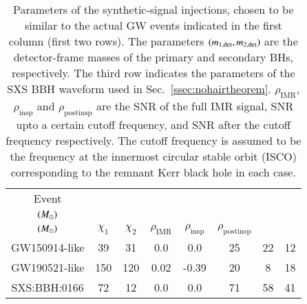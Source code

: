 \begin{table}[h!]
\begin{center}
\begin{tabular}{ c|c|c|c|c|c|c|c }

 Event & \makecell{$m_{\rm 1,det}$ \\ $(M_{\odot})$} &  \makecell{$m_{\rm 2,det}$ \\ $(M_{\odot})$} & $\chi_{1}$ & $\chi_{2}$ & $\rho_\text{IMR}$ & $\rho_\text{insp}$ & $\rho_\text{postinsp}$ \\
 \hline
 GW150914-like & 39 & 31 & 0.0 & 0.0 & 25 & 22 & 12 \\
 GW190521-like & 150 & 120 & 0.02 & -0.39 & 20 & 8 & 18 \\
 SXS:BBH:0166 & 72 & 12  & 0.0 & 0.0 & 71 & 58 & 41 \\

\end{tabular}
\caption{Parameters of the synthetic-signal injections, chosen to be similar to the actual GW events indicated in the first column (first two rows). The parameters $(m_{\rm 1,det},m_{\rm 2,det})$ are the detector-frame masses of the primary and secondary BHs, respectively. The third row indicates the parameters of the SXS BBH waveform used in Sec.~\ref{ssec:nohairtheorem}. $\rho_\text{IMR}$, $\rho_\text{insp}$ and $\rho_\text{postinsp}$ are the SNR of the full IMR signal, SNR upto a certain cutoff frequency, and SNR after the cutoff frequency respectively. The cutoff frequency is assumed to be the frequency at the innermost circular stable orbit (ISCO) corresponding to the remnant Kerr black hole in each case.}
\label{tab:injection_values}
\end{center}
\end{table}